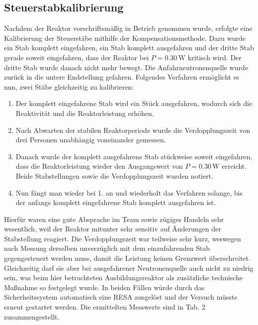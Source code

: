 \documentclass[german,  %
parskip=full,  %
]{scrartcl}
\begin{document}
\subsection{Steuerstabkalibrierung}
Nachdem der Reaktor vorschriftsmäßig in Betrieb genommen wurde, erfolgte eine Kalibrierung der Steuerstäbe mithilfe der Kompensationsmethode. Dazu wurde ein Stab komplett eingefahren, ein Stab komplett ausgefahren und der dritte Stab gerade soweit eingefahren, dass der Reaktor bei \(P=0.30\,\mathrm{W}\) kritisch wird. Der dritte Stab wurde danach nicht mehr bewegt. Die Anfahrneutronenquelle wurde zurück in die untere Endstellung gefahren. Folgendes Verfahren ermöglicht es nun, zwei Stäbe gleichzeitig zu kalibrieren:
\begin{enumerate}
\item Der komplett eingefahrene Stab wird ein Stück ausgefahren, wodurch sich die Reaktivität und die Reaktorleistung erhöhen. 
\item Nach Abwarten der stabilen Reaktorperiode wurde die Verdopplungszeit von drei Personen unabhängig voneinander gemessen.
\item Danach wurde der komplett ausgefahrene Stab stückweise soweit eingefahren, dass die Reaktorleistung wieder den Ausgangswert von \(P=0.30\,\mathrm{W}\) erreicht. Beide Stabstellungen sowie die Verdopplungszeit wurden notiert.
\item Nun fängt man wieder bei 1. an und wiederholt das Verfahren solange, bis der anfangs komplett eingefahrene Stab komplett ausgefahren ist.
\end{enumerate} 
Hierfür waren eine gute Absprache im Team sowie zügiges Handeln sehr wesentlich, weil der Reaktor mitunter sehr sensitiv auf Änderungen der Stabstellung reagiert. Die Verdopplungszeit war teilweise sehr kurz, weswegen nach Messung derselben unverzüglich mit dem einzufahrenden Stab gegengesteuert werden muss, damit die Leistung keinen Grenzwert überschreitet. Gleichzeitig darf sie aber bei ausgefahrener Neutronenquelle auch nicht zu niedrig sein, was beim hier betrachteten Ausbildungsreaktor als zusätzliche technische Maßnahme so festgelegt wurde. In beiden Fällen würde durch das Sicherheitssystem automatisch eine RESA ausgelöst und der Versuch müsste erneut gestartet werden. Die ermittelten Messwerte sind in Tab. 2 zusammengestellt.
\end{document}
